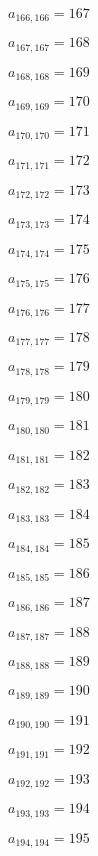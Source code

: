\documentclass[a4paper,12pt]{article}
\begin{document}
$a _{ 166, 166 } = 167$

$a _{ 167, 167 } = 168$

$a _{ 168, 168 } = 169$

$a _{ 169, 169 } = 170$

$a _{ 170, 170 } = 171$

$a _{ 171, 171 } = 172$

$a _{ 172, 172 } = 173$

$a _{ 173, 173 } = 174$

$a _{ 174, 174 } = 175$

$a _{ 175, 175 } = 176$

$a _{ 176, 176 } = 177$

$a _{ 177, 177 } = 178$

$a _{ 178, 178 } = 179$

$a _{ 179, 179 } = 180$

$a _{ 180, 180 } = 181$

$a _{ 181, 181 } = 182$

$a _{ 182, 182 } = 183$

$a _{ 183, 183 } = 184$

$a _{ 184, 184 } = 185$

$a _{ 185, 185 } = 186$

$a _{ 186, 186 } = 187$

$a _{ 187, 187 } = 188$

$a _{ 188, 188 } = 189$

$a _{ 189, 189 } = 190$

$a _{ 190, 190 } = 191$

$a _{ 191, 191 } = 192$

$a _{ 192, 192 } = 193$

$a _{ 193, 193 } = 194$

$a _{ 194, 194 } = 195$
\end{document}
